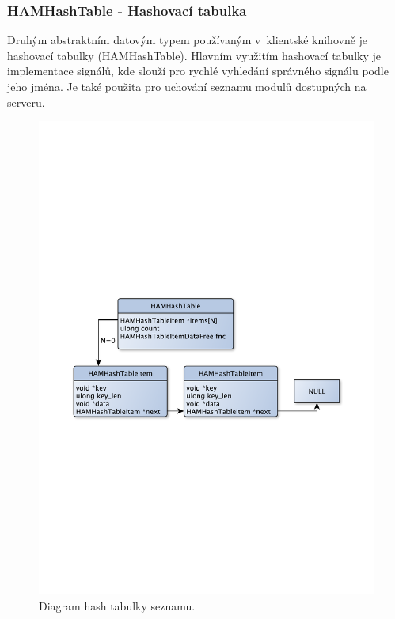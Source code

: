 \subsubsection{HAMHashTable - Hashovací tabulka}

Druhým abstraktním datovým typem používaným v~klientské knihovně je hashovací tabulky (HAMHashTable).
Hlavním využitím hashovací tabulky je implementace signálů, kde slouží pro rychlé vyhledání
správného signálu podle jeho jména. Je také použita pro uchování seznamu modulů dostupných na serveru.

\begin{figure}[h]
\centering
\includegraphics[trim=8cm 8cm 8cm 8cm, scale=0.6]{fig/hash}
\caption{Diagram hash tabulky seznamu.}
\label{fig:hamhashtable}
\end{figure}

